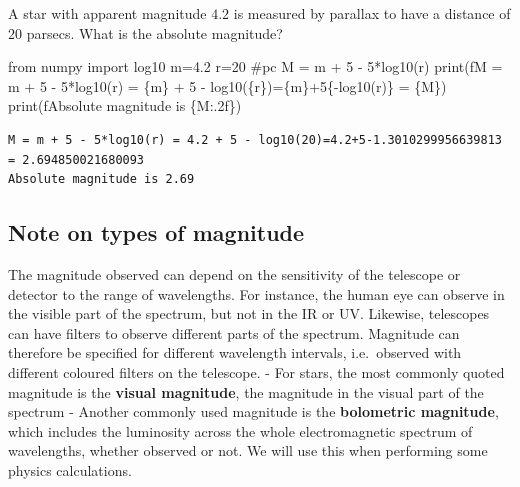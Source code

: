\documentclass[
  letterpaper,
  DIV=11,
  numbers=noendperiod]{scrreprt}
\newenvironment{Shaded}{\begin{snugshade}}{\end{snugshade}}
\newcommand{\BuiltInTok}[1]{\textcolor[rgb]{0.00,0.23,0.31}{#1}}
\newcommand{\CommentTok}[1]{\textcolor[rgb]{0.37,0.37,0.37}{#1}}
\newcommand{\DecValTok}[1]{\textcolor[rgb]{0.68,0.00,0.00}{#1}}
\newcommand{\FloatTok}[1]{\textcolor[rgb]{0.68,0.00,0.00}{#1}}
\newcommand{\ImportTok}[1]{\textcolor[rgb]{0.00,0.46,0.62}{#1}}
\newcommand{\NormalTok}[1]{\textcolor[rgb]{0.00,0.23,0.31}{#1}}
\newcommand{\OperatorTok}[1]{\textcolor[rgb]{0.37,0.37,0.37}{#1}}
\newcommand{\SpecialCharTok}[1]{\textcolor[rgb]{0.37,0.37,0.37}{#1}}
\newcommand{\SpecialStringTok}[1]{\textcolor[rgb]{0.13,0.47,0.30}{#1}}
\begin{document}
A star with apparent magnitude \(4.2\) is measured by parallax to have a
distance of \(20\) parsecs. What is the absolute magnitude?

\begin{Shaded}
\begin{Highlighting}[]
\ImportTok{from}\NormalTok{ numpy }\ImportTok{import}\NormalTok{ log10}
\NormalTok{m}\OperatorTok{=}\FloatTok{4.2}
\NormalTok{r}\OperatorTok{=}\DecValTok{20} \CommentTok{\#pc}
\NormalTok{M }\OperatorTok{=}\NormalTok{ m }\OperatorTok{+} \DecValTok{5} \OperatorTok{{-}} \DecValTok{5}\OperatorTok{*}\NormalTok{log10(r)}
\BuiltInTok{print}\NormalTok{(}\SpecialStringTok{f\textquotesingle{}M = m + 5 {-} 5*log10(r) = }\SpecialCharTok{\{}\NormalTok{m}\SpecialCharTok{\}}\SpecialStringTok{ + 5 {-} log10(}\SpecialCharTok{\{}\NormalTok{r}\SpecialCharTok{\}}\SpecialStringTok{)=}\SpecialCharTok{\{}\NormalTok{m}\SpecialCharTok{\}}\SpecialStringTok{+5}\SpecialCharTok{\{}\OperatorTok{{-}}\NormalTok{log10(r)}\SpecialCharTok{\}}\SpecialStringTok{ = }\SpecialCharTok{\{}\NormalTok{M}\SpecialCharTok{\}}\SpecialStringTok{\textquotesingle{}}\NormalTok{)}
\BuiltInTok{print}\NormalTok{(}\SpecialStringTok{f\textquotesingle{}Absolute magnitude is }\SpecialCharTok{\{}\NormalTok{M}\SpecialCharTok{:.2f\}}\SpecialStringTok{\textquotesingle{}}\NormalTok{)}
\end{Highlighting}
\end{Shaded}

\begin{verbatim}
M = m + 5 - 5*log10(r) = 4.2 + 5 - log10(20)=4.2+5-1.3010299956639813 = 2.694850021680093
Absolute magnitude is 2.69
\end{verbatim}

\hypertarget{note-on-types-of-magnitude}{%
\subsection{Note on types of
magnitude}\label{note-on-types-of-magnitude}}

The magnitude observed can depend on the sensitivity of the telescope or
detector to the range of wavelengths. For instance, the human eye can
observe in the visible part of the spectrum, but not in the IR or UV.
Likewise, telescopes can have filters to observe different parts of the
spectrum. Magnitude can therefore be specified for different wavelength
intervals, i.e.~observed with different coloured filters on the
telescope. - For stars, the most commonly quoted magnitude is the
\textbf{visual magnitude}, the magnitude in the visual part of the
spectrum - Another commonly used magnitude is the \textbf{bolometric
magnitude}, which includes the luminosity across the whole
electromagnetic spectrum of wavelengths, whether observed or not. We
will use this when performing some physics calculations.
\end{document}
